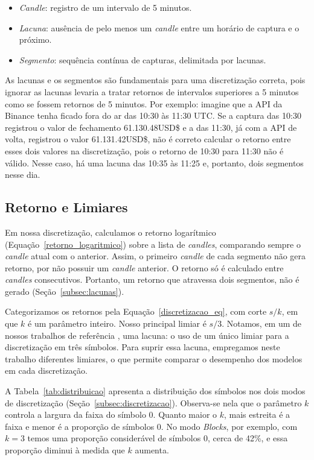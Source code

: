 \documentclass[
    12pt,                %
    openright,           %
    oneside,             %
    a4paper,             %
    english,             %
    brazil               %
]{abntex2}
\begin{document}
\begin{itemize}
\item \textit{Candle}: registro de um intervalo de 5 minutos.
\item \textit{Lacuna}: ausência de pelo menos um \textit{candle} entre um horário de captura e o próximo.
\item \textit{Segmento}: sequência contínua de capturas, delimitada por lacunas.
\end{itemize}

As lacunas e os segmentos são fundamentais para uma discretização correta, pois ignorar as lacunas levaria a tratar retornos 
de intervalos superiores a 5 minutos como se fossem retornos de 5 minutos. Por exemplo: imagine que a API da Binance tenha 
ficado fora do ar das 10:30 às 11:30 UTC. Se a captura das 10:30 registrou o valor de fechamento 61.130.48USD\$ e a das 11:30, já com a API de volta, 
registrou o valor 61.131.42USD\$, não é correto calcular o retorno entre esses dois valores na discretização, pois o retorno de 10:30 para 
11:30 não é válido. Nesse caso, há uma lacuna das 10:35 às 11:25 e, portanto, dois segmentos nesse dia.

\subsection{Retorno e Limiares}
\label{subsec:retorno}

Em nossa discretização, calculamos o retorno logarítmico (Equação~\ref{retorno_logaritmico}) sobre a lista de \textit{candles}, 
comparando sempre o \textit{candle} atual com o anterior. Assim, o primeiro \textit{candle} de cada segmento não gera retorno, 
por não possuir um \textit{candle} anterior. O retorno só é calculado entre \textit{candles} consecutivos. Portanto, um retorno 
que atravessa dois segmentos, não é gerado (Seção~\ref{subsec:lacunas}).

Categorizamos os retornos pela Equação~\ref{discretizacao_eq}, com corte $s/k$, em que $k$ é um parâmetro inteiro. 
Nosso principal limiar é $s/3$. Notamos, em um de nossos trabalhos de referência \cite{ARAUJO}, uma lacuna: o uso de um único 
limiar para a discretização em três símbolos. Para suprir essa lacuna, empregamos neste trabalho diferentes limiares, o que 
permite comparar o desempenho dos modelos em cada discretização.

A Tabela~\ref{tab:distribuicao} 
apresenta a distribuição dos símbolos nos dois modos de discretização (Seção~\ref{subsec:discretizacao}). 
Observa-se nela que o parâmetro $k$ controla a largura da faixa do símbolo 0. Quanto maior o $k$, mais estreita é a faixa e 
menor é a proporção de símbolos 0. No modo \textit{Blocks}, por exemplo, com $k = 3$ temos uma proporção considerável de símbolos 
0, cerca de 42\%, e essa proporção diminui à medida que $k$ aumenta.
\end{document}
